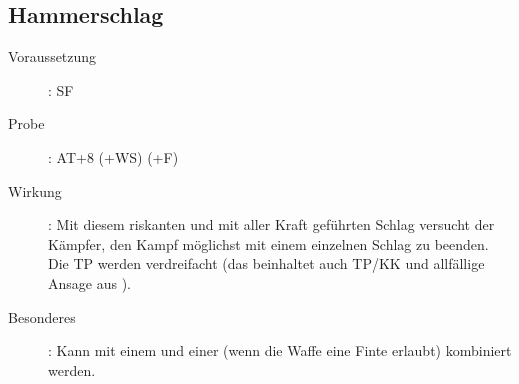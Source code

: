 \subsection{Hammerschlag}
\label{aktion.hammerschlag}
\begin{description}
    \item[Voraussetzung]:
        SF 
    \item[Probe]:
        AT+8 (+WS) (+F)
    \item[Wirkung]:
        Mit diesem riskanten und mit aller Kraft geführten Schlag versucht der Kämpfer, den Kampf möglichst mit einem einzelnen Schlag zu beenden.
        Die TP werden verdreifacht (das beinhaltet auch TP/KK und allfällige Ansage aus ).
    \item[Besonderes]:
        Kann mit einem  und einer  (wenn die Waffe eine Finte erlaubt) kombiniert werden.
\end{description}
